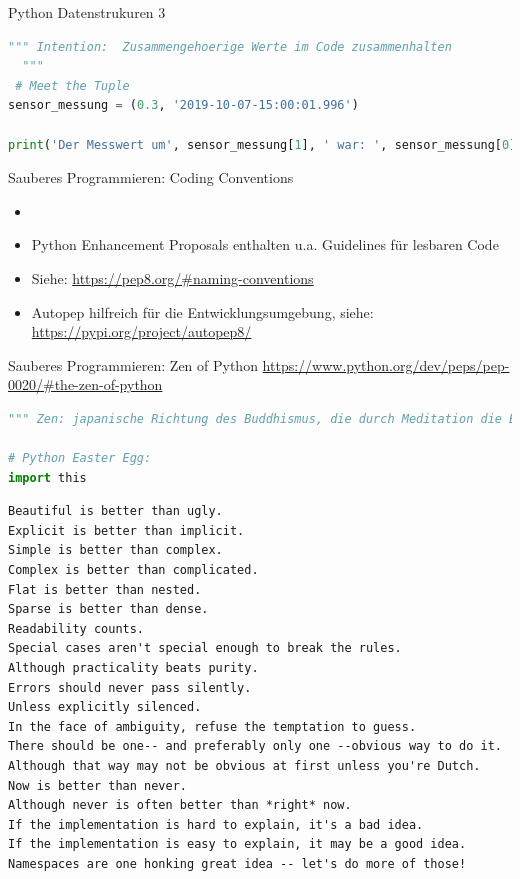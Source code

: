 \begin{frame}[fragile]{Python Datenstrukuren 3}
\begin{lstlisting}[language=Python]
 """ Intention:  Zusammengehoerige Werte im Code zusammenhalten
  """
 # Meet the Tuple
sensor_messung = (0.3, '2019-10-07-15:00:01.996')

print('Der Messwert um', sensor_messung[1], ' war: ', sensor_messung[0])

\end{lstlisting}
\end{frame}


\begin{frame}[fragile]{Sauberes Programmieren: Coding Conventions}
    \begin{itemize}
    \setlength{\itemindent}{.5in}
     \item [\textbf{ Richtlinien}]
    \end{itemize}
    \begin{itemize}
        \item Python Enhancement Proposals enthalten u.a. Guidelines für lesbaren Code
        \item Siehe: \url{https://pep8.org/#naming-conventions}
        \item Autopep hilfreich für die Entwicklungsumgebung, siehe:  \url{https://pypi.org/project/autopep8/}
     \end{itemize}
\end{frame}



\begin{frame}[fragile]{Sauberes Programmieren: Zen of Python}
\url{https://www.python.org/dev/peps/pep-0020/#the-zen-of-python}
\begin{lstlisting}[language=Python]
""" Zen: japanische Richtung des Buddhismus, die durch Meditation die Erfahrung der Einheit allen Seins und damit tätige Lebenskraft und größte Selbstbeherrschung zu erreichen sucht. """

# Python Easter Egg:
import this
\end{lstlisting}
\begin{lstlisting}	
Beautiful is better than ugly.
Explicit is better than implicit.
Simple is better than complex.
Complex is better than complicated.
Flat is better than nested.
Sparse is better than dense.
Readability counts.
Special cases aren't special enough to break the rules.
Although practicality beats purity.
Errors should never pass silently.
Unless explicitly silenced.
In the face of ambiguity, refuse the temptation to guess.
There should be one-- and preferably only one --obvious way to do it.
Although that way may not be obvious at first unless you're Dutch.
Now is better than never.
Although never is often better than *right* now.
If the implementation is hard to explain, it's a bad idea.
If the implementation is easy to explain, it may be a good idea.
Namespaces are one honking great idea -- let's do more of those!
\end{lstlisting}
\end{frame}


